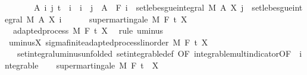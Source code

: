 \begin{isabellebody}
\ \ \ \ \ \ \ {\isachardoublequoteopen}{\isasymAnd}A\ i\ j{\isachardot}{\kern0pt}\ t\ {\isasymle}\ i\ {\isasymLongrightarrow}\ i\ {\isasymle}\ j\ {\isasymLongrightarrow}\ A\ {\isasymin}\ F\ i\ {\isasymLongrightarrow}\ set{\isacharunderscore}{\kern0pt}lebesgue{\isacharunderscore}{\kern0pt}integral\ M\ A\ {\isacharparenleft}{\kern0pt}X\ j{\isacharparenright}{\kern0pt}\ {\isasymle}\ set{\isacharunderscore}{\kern0pt}lebesgue{\isacharunderscore}{\kern0pt}integral\ M\ A\ {\isacharparenleft}{\kern0pt}X\ i{\isacharparenright}{\kern0pt}{\isachardoublequoteclose}\ \isanewline
\ \ \ \ \ {\isachardoublequoteopen}supermartingale\ M\ F\ t\ X{\isachardoublequoteclose}\isanewline
%
\isadelimproof
%
\endisadelimproof
%
\isatagproof
{}\isamarkupfalse%
\ {\isacharminus}{\kern0pt}\isanewline
\ \ \isamarkupfalse%
\ {\isacharunderscore}{\kern0pt}{\isacharcolon}{\kern0pt}\ adapted{\isacharunderscore}{\kern0pt}process\ M\ F\ t\ {\isachardoublequoteopen}{\isacharminus}{\kern0pt}X{\isachardoublequoteclose}\ \isamarkupfalse%
\ {\isacharparenleft}{\kern0pt}rule\ uminus{\isacharparenright}{\kern0pt}\isanewline
\ \ \isamarkupfalse%
\ uminus{\isacharunderscore}{\kern0pt}X{\isacharcolon}{\kern0pt}\ sigma{\isacharunderscore}{\kern0pt}finite{\isacharunderscore}{\kern0pt}adapted{\isacharunderscore}{\kern0pt}process{\isacharunderscore}{\kern0pt}linorder\ M\ F\ t\ {\isachardoublequoteopen}{\isacharminus}{\kern0pt}X{\isachardoublequoteclose}\ \isacommand{{\isachardot}{\kern0pt}{\isachardot}{\kern0pt}}\isamarkupfalse%
\isanewline
\ \ \isamarkupfalse%
\ {\isacharasterisk}{\kern0pt}\ {\isacharequal}{\kern0pt}\ set{\isacharunderscore}{\kern0pt}integral{\isacharunderscore}{\kern0pt}uminus{\isacharbrackleft}{\kern0pt}unfolded\ set{\isacharunderscore}{\kern0pt}integrable{\isacharunderscore}{\kern0pt}def{\isacharcomma}{\kern0pt}\ OF\ integrable{\isacharunderscore}{\kern0pt}mult{\isacharunderscore}{\kern0pt}indicator{\isacharbrackleft}{\kern0pt}OF\ {\isacharunderscore}{\kern0pt}\ integrable{\isacharbrackright}{\kern0pt}{\isacharbrackright}{\kern0pt}\isanewline
\ \ \isamarkupfalse%
\ {\isachardoublequoteopen}supermartingale\ M\ F\ t\ {\isacharparenleft}{\kern0pt}{\isacharminus}{\kern0pt}{\isacharparenleft}{\kern0pt}{\isacharminus}{\kern0pt}\ X{\isacharparenright}{\kern0pt}{\isacharparenright}{\kern0pt}{\isachardoublequoteclose}\isanewline

\end{isabellebody}
